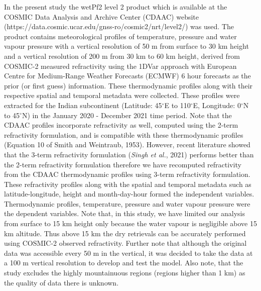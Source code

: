 \documentclass[a4paper,12pt,twoside]{article}
\begin{document}
\noindent In the present study the wetPf2 level 2 product which is available at the COSMIC Data Analysis and Archive Center (CDAAC) website (https://data.cosmic.ucar.edu/gnss-ro/cosmic2/nrt/level2/) was used. The product contains meteorological profiles of temperature, pressure and water vapour pressure with a vertical resolution of 50 m from surface to 30 km height and a vertical resolution of 200 m from 30 km to 60 km height, derived from COSMIC-2 measured refractivity using the 1DVar approach with European Centre for Medium-Range Weather Forecasts (ECMWF) 6 hour forecasts as the prior (or first guess) information. These thermodynamic profiles along with their respective spatial and temporal metadata were collected. These profiles were extracted for the Indian subcontinent (Latitude: 45$^\circ$E to 110$^\circ$E, Longitude: 0$^\circ$N to 45$^\circ$N) in the January 2020 - December 2021 time period. Note that the CDAAC profiles incorporate refractivity as well, computed using the 2-term refractivity formulation, and is compatible with these thermodynamic profiles (Equation 10 of Smith and Weintraub, 1953). However, recent literature showed that the 3-term refractivity formulation (\textit{Singh et al.}, 2021) performs better than the 2-term refractivity formulation therefore we have recomputed refractivity from the CDAAC thermodynamic profiles using 3-term refractivity formulation. These refractivity profiles along with the spatial and temporal metadata such as latitude-longitude, height and month-day-hour formed the independent variables. Thermodynamic profiles, temperature, pressure and water vapour pressure were the dependent variables. Note that, in this study, we have limited our analysis from surface to 15 km height only because the water vapour is negligible above 15 km altitude. Thus above 15 km the dry retrievals can be accurately performed using COSMIC-2 observed refractivity. Further note that although the original data was accessible every 50 m in the vertical, it was decided to take the data at a 100 m vertical  resolution to develop and test the model. Also note, that the study excludes the highly mountainuous regions (regions higher than 1 km) as the quality of data there is unknown. \\
\end{document}
